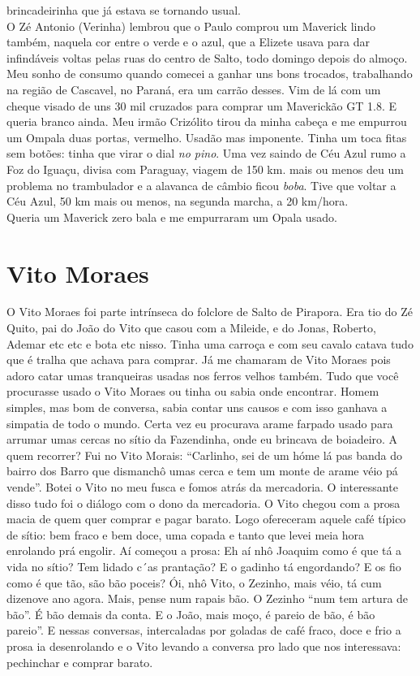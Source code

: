 \documentclass[12pt,brazil,]{book}
\begin{document}
brincadeirinha que já estava se tornando usual.\\
O Zé Antonio (Verinha) lembrou que o Paulo comprou um Maverick lindo
também, naquela cor entre o verde e o azul, que a Elizete usava para dar
infindáveis voltas pelas ruas do centro de Salto, todo domingo depois do
almoço. Meu sonho de consumo quando comecei a ganhar uns bons trocados,
trabalhando na região de Cascavel, no Paraná, era um carrão desses. Vim
de lá com um cheque visado de uns 30 mil cruzados para comprar um
Maverickão GT 1.8. E queria branco ainda. Meu irmão Crizólito tirou da
minha cabeça e me empurrou um Ompala duas portas, vermelho. Usadão mas
imponente. Tinha um toca fitas sem botões: tinha que virar o dial
\emph{no pino}. Uma vez saindo de Céu Azul rumo a Foz do Iguaçu, divisa
com Paraguay, viagem de 150 km. mais ou menos deu um problema no
trambulador e a alavanca de câmbio ficou \emph{boba}. Tive que voltar a
Céu Azul, 50 km mais ou menos, na segunda marcha, a 20 km/hora.\\
Queria um Maverick zero bala e me empurraram um Opala usado.

\section{Vito Moraes}\label{vito-moraes}

O Vito Moraes foi parte intrínseca do folclore de Salto de Pirapora. Era
tio do Zé Quito, pai do João do Vito que casou com a Mileide, e do
Jonas, Roberto, Ademar etc etc e bota etc nisso. Tinha uma carroça e com
seu cavalo catava tudo que é tralha que achava para comprar. Já me
chamaram de Vito Moraes pois adoro catar umas tranqueiras usadas nos
ferros velhos também. Tudo que você procurasse usado o Vito Moraes ou
tinha ou sabia onde encontrar. Homem simples, mas bom de conversa, sabia
contar uns causos e com isso ganhava a simpatia de todo o mundo. Certa
vez eu procurava arame farpado usado para arrumar umas cercas no sítio
da Fazendinha, onde eu brincava de boiadeiro. A quem recorrer? Fui no
Vito Morais: ``Carlinho, sei de um hóme lá pas banda do bairro dos Barro
que dismanchô umas cerca e tem um monte de arame véio pá vende''. Botei
o Vito no meu fusca e fomos atrás da mercadoria. O interessante disso
tudo foi o diálogo com o dono da mercadoria. O Vito chegou com a prosa
macia de quem quer comprar e pagar barato. Logo ofereceram aquele café
típico de sítio: bem fraco e bem doce, uma copada e tanto que levei meia
hora enrolando prá engolir. Aí começou a prosa: Eh aí nhô Joaquim como é
que tá a vida no sítio? Tem lidado c´as prantação? E o gadinho tá
engordando? E os fio como é que tão, são bão poceis? Ói, nhô Vito, o
Zezinho, mais véio, tá cum dizenove ano agora. Mais, pense num rapais
bão. O Zezinho ``num tem artura de bão''. É bão demais da conta. E o
João, mais moço, é pareio de bão, é bão pareio''. E nessas conversas,
intercaladas por goladas de café fraco, doce e frio a prosa ia
desenrolando e o Vito levando a conversa pro lado que nos interessava:
pechinchar e comprar barato.
\end{document}
